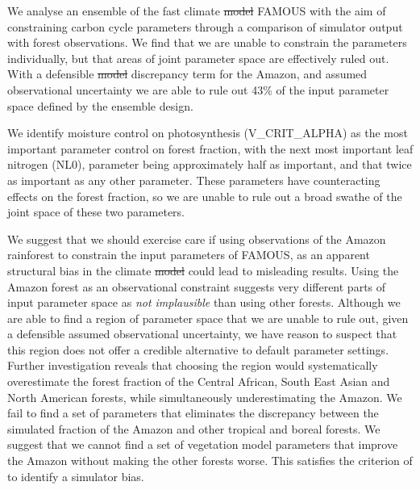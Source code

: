 \documentclass[esd, manuscript]{copernicus}
\providecommand{\DIFadd}[1]{{\protect\color{blue}\uwave{#1}}} %
\providecommand{\DIFdel}[1]{{\protect\color{red}\sout{#1}}}                      %
\providecommand{\DIFaddbegin}{} %
\providecommand{\DIFaddend}{} %
\providecommand{\DIFdelbegin}{} %
\providecommand{\DIFdelend}{} %
\begin{document}
\conclusions \label{sec:conclusions} %

We analyse an ensemble of the fast climate \DIFdelbegin \DIFdel{model }\DIFdelend \DIFaddbegin \DIFadd{simulator }\DIFaddend FAMOUS with the aim of constraining carbon cycle parameters through a comparison of simulator output with forest observations. We find that we are unable to constrain the parameters individually, but that areas of joint parameter space are effectively ruled out. With a defensible \DIFdelbegin \DIFdel{model }\DIFdelend \DIFaddbegin \DIFadd{simulator }\DIFaddend discrepancy term for the Amazon, and assumed observational uncertainty we are able to rule out 43\% of the input parameter space defined by the ensemble design.

We identify moisture control on photosynthesis (V\_CRIT\_ALPHA) as the most important parameter control on forest fraction, with the next most important leaf nitrogen (NL0), parameter being approximately half as important, and that twice as important as any other parameter. These parameters have counteracting effects on the forest fraction, so we are unable to rule out a broad swathe of the joint space of these two parameters.

We suggest that we should exercise care if using observations of the Amazon rainforest to constrain the input parameters of FAMOUS, as an apparent structural bias in the climate \DIFdelbegin \DIFdel{model }\DIFdelend \DIFaddbegin \DIFadd{simulator }\DIFaddend could lead to misleading results. Using the Amazon forest as an observational constraint suggests very different parts of input parameter space as \emph{not implausible} than using other forests. Although we are able to find a region of parameter space that we are unable to rule out, given a defensible assumed observational uncertainty, we have reason to suspect that this region does not offer a credible alternative to default parameter settings. Further investigation reveals that choosing the region would systematically overestimate the forest fraction of the Central African, South East Asian and North American forests, while simultaneously underestimating the Amazon. We fail to find a set of parameters that eliminates the discrepancy between the simulated fraction of the Amazon and other tropical and boreal forests. We suggest that we cannot find a set of vegetation model parameters that improve the Amazon without making the other forests worse. This satisfies the criterion of \cite{williamson2014identifying} to identify a simulator bias. 
\end{document}
